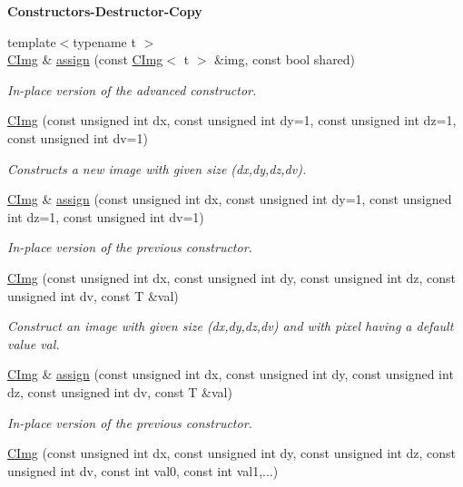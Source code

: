\begin{Indent}{\bf Constructors-\/\-Destructor-\/\-Copy}
\begin{DoxyCompactItemize}
\item 
{\footnotesize template$<$typename t $>$ }\\\hyperlink{structcimg__library_1_1_c_img}{C\-Img} \& \hyperlink{structcimg__library_1_1_c_img_acb24b21aeca1398549a3b11ec6bfa8d1}{assign} (const \hyperlink{structcimg__library_1_1_c_img}{C\-Img}$<$ t $>$ \&img, const bool shared)
\begin{DoxyCompactList}\small\item\em In-\/place version of the advanced constructor. \end{DoxyCompactList}\item 
\hyperlink{structcimg__library_1_1_c_img_a3c57bd9536e4cc2df00a902a377f1b3b}{C\-Img} (const unsigned int dx, const unsigned int dy=1, const unsigned int dz=1, const unsigned int dv=1)
\begin{DoxyCompactList}\small\item\em Constructs a new image with given size ({\ttfamily dx},{\ttfamily dy},{\ttfamily dz},{\ttfamily dv}). \end{DoxyCompactList}\item 
\hyperlink{structcimg__library_1_1_c_img}{C\-Img} \& \hyperlink{structcimg__library_1_1_c_img_a32e4857acca9063f247a025e163e41b8}{assign} (const unsigned int dx, const unsigned int dy=1, const unsigned int dz=1, const unsigned int dv=1)
\begin{DoxyCompactList}\small\item\em In-\/place version of the previous constructor. \end{DoxyCompactList}\item 
\hyperlink{structcimg__library_1_1_c_img_ad024111e98670fe76bea4012a182790d}{C\-Img} (const unsigned int dx, const unsigned int dy, const unsigned int dz, const unsigned int dv, const T \&val)
\begin{DoxyCompactList}\small\item\em Construct an image with given size ({\ttfamily dx},{\ttfamily dy},{\ttfamily dz},{\ttfamily dv}) and with pixel having a default value {\ttfamily val}. \end{DoxyCompactList}\item 
\hyperlink{structcimg__library_1_1_c_img}{C\-Img} \& \hyperlink{structcimg__library_1_1_c_img_ac7f3c90ee5f43317abfbc6a7bb3d4ea6}{assign} (const unsigned int dx, const unsigned int dy, const unsigned int dz, const unsigned int dv, const T \&val)
\begin{DoxyCompactList}\small\item\em In-\/place version of the previous constructor. \end{DoxyCompactList}\item 
\hypertarget{structcimg__library_1_1_c_img_a4c3e9649f52640863834b7e075d57b4a}{\hyperlink{structcimg__library_1_1_c_img_a4c3e9649f52640863834b7e075d57b4a}{C\-Img} (const unsigned int dx, const unsigned int dy, const unsigned int dz, const unsigned int dv, const int val0, const int val1,...)}\label{structcimg__library_1_1_c_img_a4c3e9649f52640863834b7e075d57b4a}


\end{DoxyCompactItemize}
\end{Indent}
